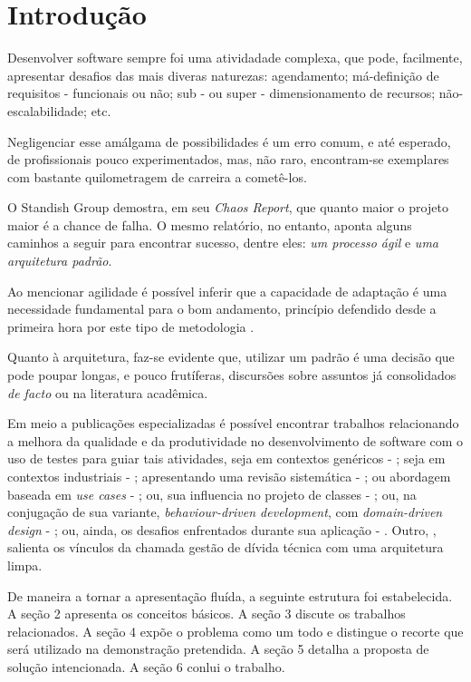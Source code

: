 \section{Introdução}

  Desenvolver software sempre foi uma atividadade complexa, que pode, facilmente,  apresentar desafios das mais diveras naturezas: agendamento; má-definição de  requisitos - funcionais ou não; sub - ou super - dimensionamento de recursos; não-escalabilidade; etc.

  Negligenciar esse amálgama de possibilidades é um erro comum, e até esperado, de profissionais pouco experimentados, mas, não raro, encontram-se exemplares com bastante quilometragem de carreira a cometê-los.

  O Standish Group demostra, em seu \emph{Chaos Report}\cite{ChaosReport2015}, que quanto maior o projeto maior é a chance de falha. O mesmo relatório, no entanto, aponta alguns caminhos a seguir para encontrar sucesso, dentre eles: \emph{um processo ágil} e \emph{uma arquitetura padrão}.

  Ao mencionar agilidade é possível inferir que a capacidade de adaptação é uma  necessidade fundamental para o bom andamento, princípio defendido desde a  primeira hora por este tipo de metodologia \cite{ManifestoAgil2001}.

  Quanto à arquitetura, faz-se evidente que, utilizar um padrão é uma decisão que pode poupar longas, e pouco frutíferas, discursões sobre assuntos já consolidados \emph{de facto} ou na literatura acadêmica.

  Em meio a publicações especializadas é possível encontrar trabalhos relacionando a melhora da qualidade e da produtividade no desenvolvimento de software com o uso de testes para guiar tais atividades, seja em contextos genéricos - \cite{Aguilar2016}; seja em contextos industriais - \cite{Gustavsson2017}; apresentando uma revisão sistemática - \cite{Benato2021}; ou abordagem baseada em \emph{use cases} - \cite{Milanez2014}; ou, sua influencia no projeto de classes - \cite{Aniche2012}; ou, na conjugação de sua variante, \emph{behaviour-driven development}, com \emph{domain-driven design} - \cite{Santos2015}; ou, ainda, os desafios enfrentados durante sua aplicação - \cite{Adhikari2019}. Outro, \cite{Beltrao2020}, salienta os vínculos da chamada gestão de dívida técnica com uma arquitetura limpa.

  De maneira a tornar a apresentação fluída, a seguinte estrutura foi estabelecida. A seção 2 apresenta os conceitos básicos. A seção 3 discute os trabalhos relacionados. A seção 4 expõe o problema como um todo e distingue o recorte que será utilizado na demonstração pretendida. A seção 5 detalha a proposta de solução intencionada. A seção 6 conlui o trabalho.
